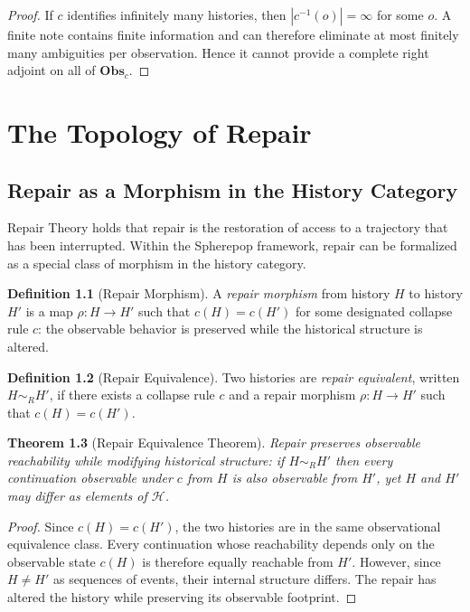 \documentclass[12pt, a4paper, openany]{book}
\theoremstyle{plain}
\newtheorem{theorem}{Theorem}[chapter]
\theoremstyle{definition}
\newtheorem{definition}[theorem]{Definition}
\theoremstyle{remark}
\newcommand{\Obs}{\mathbf{Obs}}
\newcommand{\calH}{\mathcal{H}}
\begin{document}
\begin{proof}
If $c$ identifies infinitely many histories, then $|c^{-1}(o)| = \infty$ for
some $o$. A finite note contains finite information and can therefore eliminate
at most finitely many ambiguities per observation. Hence it cannot provide a
complete right adjoint on all of $\Obs_c$.
\end{proof}

\chapter{The Topology of Repair}

\section{Repair as a Morphism in the History Category}

Repair Theory holds that repair is the restoration of access to a trajectory
that has been interrupted. Within the Spherepop framework, repair can be
formalized as a special class of morphism in the history category.

\begin{definition}[Repair Morphism]
A \emph{repair morphism} from history $H$ to history $H'$ is a map
$\rho : H \to H'$ such that $c(H) = c(H')$ for some designated collapse rule
$c$: the observable behavior is preserved while the historical structure is altered.
\end{definition}

\begin{definition}[Repair Equivalence]
Two histories are \emph{repair equivalent}, written $H \sim_R H'$, if there
exists a collapse rule $c$ and a repair morphism $\rho : H \to H'$ such that
$c(H) = c(H')$.
\end{definition}

\begin{theorem}[Repair Equivalence Theorem]
Repair preserves observable reachability while modifying historical structure:
if $H \sim_R H'$ then every continuation observable under $c$ from $H$ is
also observable from $H'$, yet $H$ and $H' $ may differ as elements of $\calH$.
\end{theorem}

\begin{proof}
Since $c(H) = c(H')$, the two histories are in the same observational equivalence
class. Every continuation whose reachability depends only on the observable state
$c(H)$ is therefore equally reachable from $H'$. However, since $H \neq H'$ as
sequences of events, their internal structure differs. The repair has altered the
history while preserving its observable footprint.
\end{proof}
\end{document}
